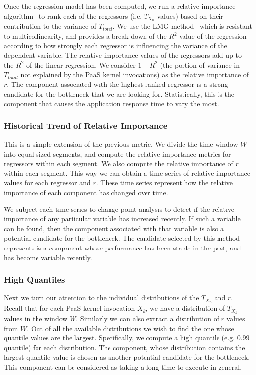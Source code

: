 Once the regression model has been computed, we run a relative importance algorithm~\cite{JSSv017i01} to rank each of the
regressors (i.e. $T_{X_n}$ values) based on their contribution to the variance of $T_{total}$. 
We use the LMG method~\cite{lmg80} which is resistant to multicollinearity, and provides a break down of the $R^2$ value of
the regression according to how strongly each regressor is influencing the variance of the dependent variable.
The relative importance values of the regressors add up to the $R^2$ of the linear regression. We consider
$1 - R^2$ (the portion of variance in $T_{total}$ not explained by the PaaS kernel invocations) as the relative importance of $r$. 
The component associated with the highest ranked regressor is a strong candidate
for the bottleneck that we are looking for. Statistically, this is the component that causes the application
response time to vary the most.

\subsubsection{Historical Trend of Relative Importance}
This is a simple extension of the previous metric. We divide the time window $W$ into equal-sized segments,
and compute the relative importance metrics for regressors within each segment. We also compute the
relative importance of $r$ within each segment. This way we can
obtain a time series of relative importance values for each regressor and $r$. These time series
represent how the relative importance of each component has changed over time.

We subject each time series to change point analysis to detect if the relative importance of any particular
variable has increased recently. If such a variable can be found, then the component
associated with that variable is also a potential candidate for the bottleneck. 
The candidate selected by this method represents is
a component whose performance has been stable in the past, and has become variable recently. 

\subsubsection{High Quantiles}
Next we turn our attention to the individual distributions of the $T_{X_n}$ and $r$. 
Recall that for each PaaS kernel invocation
$X_k$, we have a distribution of $T_{X_k}$ values in the window $W$. Similarly we
can also extract a distribution of $r$ values from $W$. Out of all the available distributions
we wish to find the one whose quantile values are the largest.
Specifically, we compute a high
quantile (e.g. 0.99 quantile) for each distribution. The component, whose distribution 
contains the largest quantile value
is chosen as another potential candidate for the bottleneck. This component can be considered
as taking a long time to execute in general.

